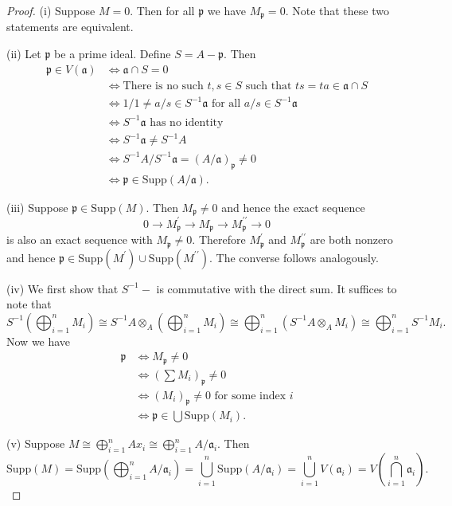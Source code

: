 \begin{proof}
(i) Suppose $M=0$. Then for all $\mathfrak{p}$ we have $M_\mathfrak{p}=0$. Note that these two statements are equivalent.\par
(ii) Let $\mathfrak{p}$ be a prime ideal. Define $S=A-\mathfrak{p}$. Then 
$$
\begin{aligned}
\mathfrak{p}\in V(\mathfrak{a}) & \iff \mathfrak{a}\cap S=0 \\
& \iff \text{There is no such }t,s\in S\text{ such that }ts=ta\in\mathfrak{a}\cap S \\
& \iff 1/1\ne a/s\in S^{-1}\mathfrak{a}\text{ for all }a/s\in S^{-1}\mathfrak{a} \\
& \iff S^{-1}\mathfrak{a}\text{ has no identity} \\
& \iff S^{-1}\mathfrak{a}\ne S^{-1}A \\
& \iff S^{-1}A/S^{-1}\mathfrak{a}=(A/\mathfrak{a})_\mathfrak{p}\ne 0 \\
& \iff \mathfrak{p}\in\mathrm{Supp}(A/\mathfrak{a}).
\end{aligned}
$$\par
(iii) Suppose $\mathfrak{p}\in\mathrm{Supp}(M)$. Then $M_\mathfrak{p}\ne 0$ and hence the exact sequence 
$$
0\longrightarrow M_{\mathfrak{p}}^{\prime}\longrightarrow M_{\mathfrak{p}}\longrightarrow M_{\mathfrak{p}}^{\prime\prime}\longrightarrow 0
$$
is also an exact sequence with $M_\mathfrak{p}\ne 0$. Therefore $M_\mathfrak{p}^\prime$ and $M_\mathfrak{p}^{\prime\prime}$ are both nonzero and hence $\mathfrak{p}\in\mathrm{Supp}(M^\prime)\cup\mathrm{Supp}(M^{\prime\prime})$. The converse follows analogously.\par
(iv) We first show that $S^{-1}-$ is commutative with the direct sum. It suffices to note that 
$$
S^{-1}\left( \bigoplus_{i=1}^n{M_i} \right) \cong S^{-1}A\otimes _A\left( \bigoplus_{i=1}^n{M_i} \right) \cong \bigoplus_{i=1}^n{\left( S^{-1}A\otimes _AM_i \right)}\cong \bigoplus_{i=1}^n{S^{-1}M_i}.
$$
Now we have  
$$
\begin{aligned}
\mathfrak{p} & \iff M_\mathfrak{p}\ne 0 \\
& \iff \left(\sum M_i\right)_\mathfrak{p}\ne 0 \\
& \iff (M_i)_\mathfrak{p}\ne 0\text{ for some index }i \\
& \iff \mathfrak{p}\in\bigcup\mathrm{Supp}(M_i).
\end{aligned}
$$\par
(v) Suppose $M\cong\bigoplus_{i=1}^nAx_i\cong\bigoplus_{i=1}^nA/\mathfrak{a}_i$. Then 
$$
\mathrm{Supp}\left( M \right) =\mathrm{Supp}\left( \bigoplus_{i=1}^n{A/\mathfrak{a} _i} \right) =\bigcup_{i=1}^n{\mathrm{Supp}\left( A/\mathfrak{a} _i \right)}=\bigcup_{i=1}^n{V\left( \mathfrak{a} _i \right)}=V\left( \bigcap_{i=1}^n{\mathfrak{a} _i} \right) .
$$
\end{proof}
